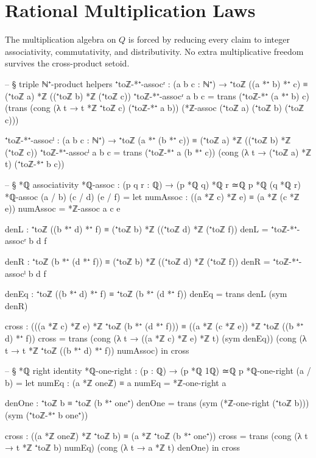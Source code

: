 \documentclass[11pt,a4paper]{book}
\def\mathbb#1{#1}%
\begin{document}
\section{Rational Multiplication Laws}

The multiplication algebra on $\mathbb{Q}$ is forced by reducing every
claim to integer associativity, commutativity, and distributivity. No extra
multiplicative freedom survives the cross-product setoid.

\begin{code}
-- § triple ℕ⁺-product helpers
⁺toℤ-*⁺-assocʳ : (a b c : ℕ⁺) → ⁺toℤ ((a *⁺ b) *⁺ c) ≡ (⁺toℤ a) *ℤ ((⁺toℤ b) *ℤ (⁺toℤ c))
⁺toℤ-*⁺-assocʳ a b c =
  trans
    (⁺toℤ-*⁺ (a *⁺ b) c)
    (trans
      (cong (λ t → t *ℤ ⁺toℤ c) (⁺toℤ-*⁺ a b))
      (*ℤ-assoc (⁺toℤ a) (⁺toℤ b) (⁺toℤ c)))

⁺toℤ-*⁺-assocˡ : (a b c : ℕ⁺) → ⁺toℤ (a *⁺ (b *⁺ c)) ≡ (⁺toℤ a) *ℤ ((⁺toℤ b) *ℤ (⁺toℤ c))
⁺toℤ-*⁺-assocˡ a b c =
  trans
    (⁺toℤ-*⁺ a (b *⁺ c))
    (cong (λ t → (⁺toℤ a) *ℤ t) (⁺toℤ-*⁺ b c))

-- § *ℚ associativity
*ℚ-assoc : (p q r : ℚ) → (p *ℚ q) *ℚ r ≃ℚ p *ℚ (q *ℚ r)
*ℚ-assoc (a / b) (c / d) (e / f) =
  let
    numAssoc : ((a *ℤ c) *ℤ e) ≡ (a *ℤ (c *ℤ e))
    numAssoc = *ℤ-assoc a c e

    denL : ⁺toℤ ((b *⁺ d) *⁺ f) ≡ (⁺toℤ b) *ℤ ((⁺toℤ d) *ℤ (⁺toℤ f))
    denL = ⁺toℤ-*⁺-assocʳ b d f

    denR : ⁺toℤ (b *⁺ (d *⁺ f)) ≡ (⁺toℤ b) *ℤ ((⁺toℤ d) *ℤ (⁺toℤ f))
    denR = ⁺toℤ-*⁺-assocˡ b d f

    denEq : ⁺toℤ ((b *⁺ d) *⁺ f) ≡ ⁺toℤ (b *⁺ (d *⁺ f))
    denEq = trans denL (sym denR)

    cross : (((a *ℤ c) *ℤ e) *ℤ ⁺toℤ (b *⁺ (d *⁺ f))) ≡ ((a *ℤ (c *ℤ e)) *ℤ ⁺toℤ ((b *⁺ d) *⁺ f))
    cross =
      trans
        (cong (λ t → ((a *ℤ c) *ℤ e) *ℤ t) (sym denEq))
        (cong (λ t → t *ℤ ⁺toℤ ((b *⁺ d) *⁺ f)) numAssoc)
  in
  cross

-- § *ℚ right identity
*ℚ-one-right : (p : ℚ) → (p *ℚ 1ℚ) ≃ℚ p
*ℚ-one-right (a / b) =
  let
    numEq : (a *ℤ oneℤ) ≡ a
    numEq = *ℤ-one-right a

    denOne : ⁺toℤ b ≡ ⁺toℤ (b *⁺ one⁺)
    denOne =
      trans
        (sym (*ℤ-one-right (⁺toℤ b)))
        (sym (⁺toℤ-*⁺ b one⁺))

    cross : ((a *ℤ oneℤ) *ℤ ⁺toℤ b) ≡ (a *ℤ ⁺toℤ (b *⁺ one⁺))
    cross =
      trans
        (cong (λ t → t *ℤ ⁺toℤ b) numEq)
        (cong (λ t → a *ℤ t) denOne)
  in
  cross


\end{code}
\end{document}

